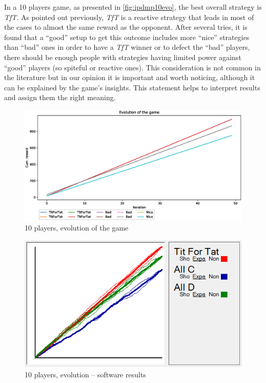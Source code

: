 \documentclass[journal,10pt,twoside]{IEEEtran}
\begin{document}
In a 10 players game, as presented in \autoref{fig:ipdmp10evo}, the best overall strategy is \textit{TfT}. As pointed out previously, \textit{TfT} is a reactive strategy that leads in most of the cases to almost the same reward as the opponent. After several tries, it is found that a ``good'' setup to get this outcome includes more ``nice'' strategies than ``bad'' ones in order to have a \textit{TfT} winner or to defect the ``bad'' players, there should be enough people with strategies having limited power against ``good'' players (so spiteful or reactive ones). This consideration is not common in the literature but in our opinion it is important and worth noticing, although it can be explained by the game's insights. This statement helps to interpret results and assign them the right meaning.

\begin{figure}[!ht]
    \centering
    \includegraphics[width=1\columnwidth]{../img/ipdmp/ipdmp-evolution-of-game-10}
    \caption{10 players, evolution of the game}
    \label{fig:ipdmp10evo}
\end{figure}

\begin{figure}[!ht]
    \centering
    \includegraphics[width=.8\columnwidth]{../img/ipdmp/ipdmp10-plot-det}
    \caption{10 players, evolution -- software results \cite{demosw}}
    \label{fig:ipdmp10evosw}
\end{figure}
\end{document}
